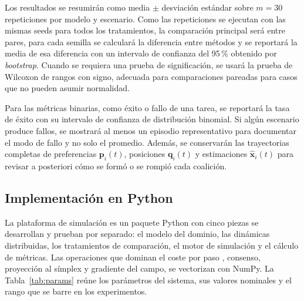 Los resultados se resumirán como media $\pm$ desviación estándar sobre $m = 30$
repeticiones por modelo y escenario. Como las repeticiones se ejecutan con las
mismas seeds para todos los tratamientos, la comparación principal será entre pares,
para cada semilla se calculará la diferencia entre métodos y se reportará la media de
esa diferencia con un intervalo de confianza del 95\,\% obtenido por
\emph{bootstrap}. Cuando se requiera una prueba de significación, se usará la prueba
de Wilcoxon de rangos con signo, adecuada para comparaciones pareadas para casos que no pueden asumir
normalidad.

Para las métricas binarias, como éxito o fallo de una tarea, se reportará la tasa de
éxito con su intervalo de confianza de distribución binomial. Si algún escenario produce fallos, se
mostrará al menos un episodio representativo para documentar el modo de fallo y no
solo el promedio. Además, se conservarán las trayectorias completas de preferencias
$\mathbf{p}_i(t)$, posiciones $\mathbf{q}_i(t)$ y estimaciones
$\hat{\mathbf{x}}_i(t)$ para revisar a posteriori cómo se formó o se rompió cada
coalición.

\subsection{Implementación en Python}

La plataforma de simulación es un paquete Python con cinco piezas se desarrollan
y prueban por separado: el modelo del dominio, las dinámicas distribuidas, los
tratamientos de comparación, el motor de simulación y el cálculo de métricas. Las
operaciones que dominan el coste por paso , consenso, proyección al símplex y gradiente
del campo, se vectorizan con NumPy. La Tabla~\ref{tab:params} reúne los parámetros del
sistema, sus valores nominales y el rango que se barre en los experimentos.

